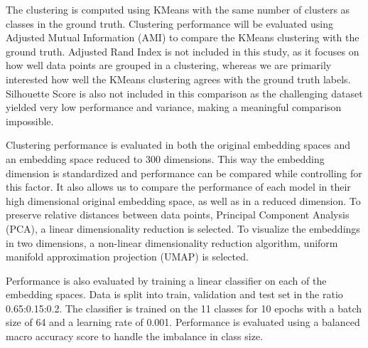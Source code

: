 The clustering is computed using KMeans with the same number of clusters as classes in the ground truth. 
Clustering performance will be evaluated using Adjusted Mutual Information (AMI) \cite{romano_standardized_2014} to compare the KMeans clustering with the ground truth.
Adjusted Rand Index is not included in this study, as it focuses on how well data points are grouped in a clustering, whereas we are primarily interested how well the KMeans clustering agrees with the ground truth labels.
Silhouette Score is also not included in this comparison as the challenging dataset yielded very low performance and variance, making a meaningful comparison impossible.

Clustering performance is evaluated in both the original embedding spaces and an embedding space reduced to 300 dimensions.
This way the embedding dimension is standardized and performance can be compared while controlling for this factor.
It also allows us to compare the performance of each model in their high dimensional original embedding space, as well as in a reduced dimension.
To preserve relative distances between data points, Principal Component Analysis (PCA), a linear dimensionality reduction is selected.
To visualize the embeddings in two dimensions, a non-linear dimensionality reduction algorithm, uniform manifold approximation projection (UMAP) \cite{mcinnes_umap_2020} is selected.

Performance is also evaluated by training a linear classifier on each of the embedding spaces.
Data is split into train, validation and test set in the ratio 0.65:0.15:0.2.
The classifier is trained on the 11 classes for 10 epochs with a batch size of 64 and a learning rate of 0.001. 
Performance is evaluated using a balanced macro accuracy score \cite{brodersen_balanced_2010} to handle the imbalance in class size.


